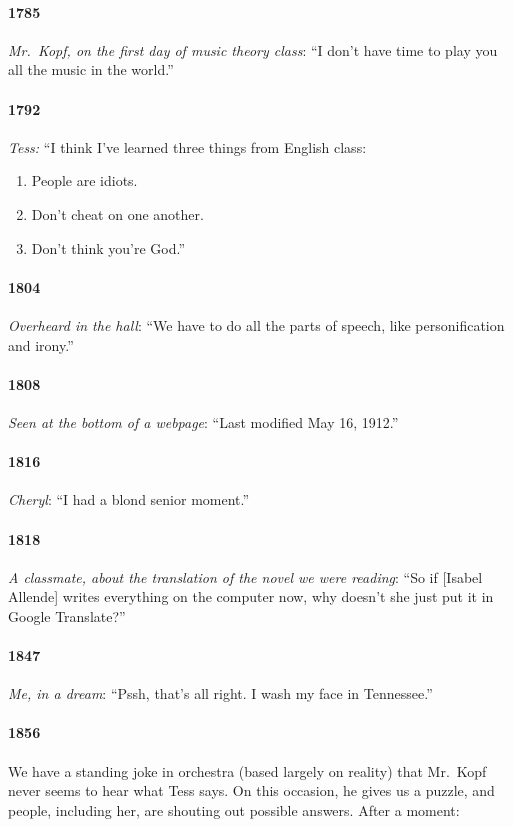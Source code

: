\documentclass[10pt]{memoir}
\newcommand{\intro}[1]{\emph{#1}}
\begin{document}
\paragraph{1785} \intro{Mr.\ Kopf, on the first day of music theory class}: ``I don't have time to play you all the music in the world.''

\paragraph{1792} \intro{Tess:} ``I think I've learned three things from English class:
\begin{enumerate}
  \setlength{\itemsep}{-3pt}
  \item People are idiots.
  \item Don't cheat on one another.
  \item Don't think you're God.''
\end{enumerate}

\paragraph{1804} \intro{Overheard in the hall}: ``We have to do all the parts of speech, like personification and irony.''

\paragraph{1808} \intro{Seen at the bottom of a webpage}: ``Last modified May 16, 1912.''

\paragraph{1816} \intro{Cheryl}: ``I had a blond senior moment.''

\paragraph{1818} \intro{A classmate, about the translation of the novel we were reading}: ``So if [Isabel Allende] writes everything on the computer now, why doesn't she just put it in Google Translate?''

\paragraph{1847} \intro{Me, in a dream}: ``Pssh, that's all right. I wash my face in Tennessee.''

\paragraph{1856} We have a standing joke in orchestra (based largely on reality) that Mr.\ Kopf never seems to hear what Tess says. On this occasion, he gives us a puzzle, and people, including her, are shouting out possible answers. After a moment:\\
\end{document}
